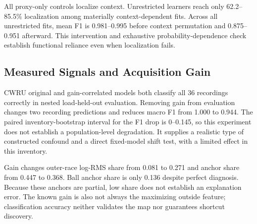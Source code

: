 \documentclass[conference]{IEEEtran}
\begin{document}
All proxy-only controls localize context. Unrestricted learners reach only 62.2--85.5\% localization among materially context-dependent fits. Across all unrestricted fits, mean F1 is 0.981--0.995 before context permutation and 0.875--0.951 afterward. This intervention and exhaustive probability-dependence check establish functional reliance even when localization fails.

\subsection{Measured Signals and Acquisition Gain}
CWRU original and gain-correlated models both classify all 36 recordings correctly in nested load-held-out evaluation. Removing gain from evaluation changes two recording predictions and reduces macro F1 from 1.000 to 0.944. The paired inventory-bootstrap interval for the F1 drop is 0--0.145, so this experiment does not establish a population-level degradation. It supplies a realistic type of constructed confound and a direct fixed-model shift test, with a limited effect in this inventory.

\begin{table}[t]
\centering
\caption{Measured alignment controls: pooled recording binary F1 for full and own-anchor heads; Mask replaces own anchors by training medians in restricted heads. $\Delta_g$ is the maximum full-head window-probability change under gain 0.25/4; it is zero for every restricted head. Rows share recordings.}
\label{tab:industrial-alignment}
\footnotesize
\setlength{\tabcolsep}{2pt}

\end{table}

Gain changes outer-race log-RMS share from 0.081 to 0.271 and anchor share from 0.447 to 0.368. Ball anchor share is only 0.136 despite perfect diagnosis. Because these anchors are partial, low share does not establish an explanation error. The known gain is also not always the maximizing outside feature; classification accuracy neither validates the map nor guarantees shortcut discovery.

\begin{table}[t]
\centering
\caption{CWRU diagnostic follow-up: all axis/view results, with nested selection inside each outer training split. F1 is recording macro F1 over the same 36-recording inventory. Original uses unmodified signals; Gain uses matched gain-correlated signals; Gain removed evaluates those fixed models without gain. Counts refer to the last column's predictions. These descriptive results are dependent across rows and do not imply population-level significance.}
\label{tab:cwru-followup}
\footnotesize

\end{table}
\end{document}
